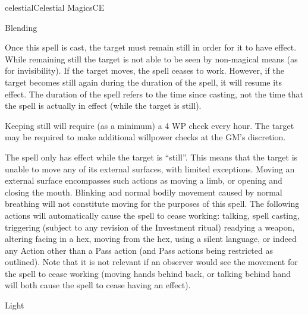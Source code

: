 \begin{college}[1.3]{celestial}{Celestial Magics}{CE}
\begin{spell}[G-1]{Blending}
\begin{effects}
Once this spell is cast, the target must remain still in order for it
to have effect.  While remaining still the target is not able to be
seen by non-magical means (\ie as for invisibility).  If the target
moves, the spell ceases to work.  However, if the target becomes still
again during the duration of the spell, it will resume its effect.
The duration of the spell refers to the time since casting, not the
time that the spell is actually in effect (\ie while the target is
still).

Keeping still will require (as a minimum) a 4 \x WP check every
hour.  The target may be required to make additional willpower checks
at the GM's discretion.

The spell only has effect while the target is ``still''.  This means
that the target is unable to move any of its external surfaces, with
limited exceptions.  Moving an external surface encompasses such
actions as moving a limb, or opening and closing the mouth.  Blinking
and normal bodily movement caused by normal breathing will not
constitute moving for the purposes of this spell.  The following
actions will automatically cause the spell to cease working: talking,
spell casting, triggering (subject to any revision of the Investment
ritual) readying a weapon, altering facing in a hex, moving from the
hex, using a silent language, or indeed any Action other than a Pass
action (and Pass actions being restricted as outlined).  Note that it
is not relevant if an observer would see the movement for the spell to
cease working (\eg moving hands behind back, or talking behind hand
will both cause the spell to cease having an effect).

\end{effects}
\end{spell}

\begin{spell}[G-2]{Light}


\end{spell}
\end{college}
